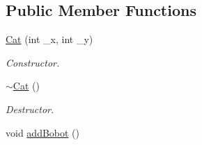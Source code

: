 \subsection*{Public Member Functions}
\begin{DoxyCompactItemize}
\item 
\hyperlink{classCat_a1dc60e85d1863d683c621f886dae1655}{Cat} (int \-\_\-x, int \-\_\-y)
\begin{DoxyCompactList}\small\item\em Constructor. \end{DoxyCompactList}\item 
\hypertarget{classCat_accae87693b84127a716243cbf5e6ddee}{\hyperlink{classCat_accae87693b84127a716243cbf5e6ddee}{$\sim$\-Cat} ()}\label{classCat_accae87693b84127a716243cbf5e6ddee}

\begin{DoxyCompactList}\small\item\em Destructor. \end{DoxyCompactList}\item 
\hypertarget{classCat_a72639929e5e40bbf1f6af6cc72e43717}{void \hyperlink{classCat_a72639929e5e40bbf1f6af6cc72e43717}{add\-Bobot} ()}\label{classCat_a72639929e5e40bbf1f6af6cc72e43717}


\end{DoxyCompactItemize}
